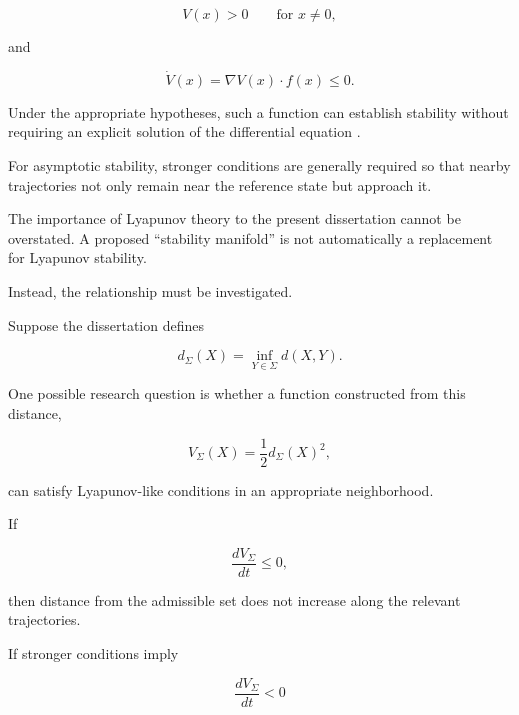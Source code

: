 \documentclass[12pt,oneside]{book}
\begin{document}
\begin{equation}
    V(x)>0
    \qquad
    \text{for }x\neq 0,
\end{equation}

and

\begin{equation}
    \dot{V}(x)
    =
    \nabla V(x)\cdot f(x)
    \leq
    0.
    \label{eq:lyapunov-derivative}
\end{equation}

Under the appropriate hypotheses, such a function can establish
stability without requiring an explicit solution of the
differential equation \parencite{Lyapunov1966}.

For asymptotic stability, stronger conditions are generally
required so that nearby trajectories not only remain near the
reference state but approach it.

The importance of Lyapunov theory to the present dissertation
cannot be overstated. A proposed ``stability manifold'' is not
automatically a replacement for Lyapunov stability.

Instead, the relationship must be investigated.

Suppose the dissertation defines

\begin{equation}
    d_{\Sigma}(X)
    =
    \inf_{Y\in\Sigma}
    d(X,Y).
\end{equation}

One possible research question is whether a function constructed
from this distance,

\begin{equation}
    V_{\Sigma}(X)
    =
    \frac{1}{2}
    d_{\Sigma}(X)^2,
    \label{eq:manifold-distance-lyapunov}
\end{equation}

can satisfy Lyapunov-like conditions in an appropriate
neighborhood.

If

\begin{equation}
    \frac{dV_{\Sigma}}{dt}
    \leq
    0,
    \label{eq:manifold-distance-decrease}
\end{equation}

then distance from the admissible set does not increase along
the relevant trajectories.

If stronger conditions imply

\begin{equation}
    \frac{dV_{\Sigma}}{dt}
    <
    0
\end{equation}
\end{document}
